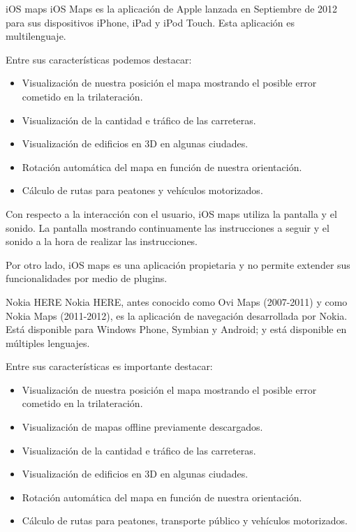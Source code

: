 \begin{definitionlist}
  \item[iOS maps] iOS Maps es la aplicación de Apple lanzada en Septiembre de 2012 para sus
    dispositivos iPhone, iPad y iPod Touch. Esta aplicación es multilenguaje.

    Entre sus características podemos destacar:

    \begin{itemize}
      \item Visualización de nuestra posición el mapa mostrando el posible error cometido en la
        trilateración.
      \item Visualización de la cantidad e tráfico de las carreteras.
      \item Visualización de edificios en 3D en algunas ciudades.
      \item Rotación automática del mapa en función de nuestra orientación.
      \item Cálculo de rutas para peatones y vehículos motorizados.
    \end{itemize}

    Con respecto a la interacción con el usuario, iOS maps utiliza la pantalla y el sonido. La
    pantalla mostrando continuamente las instrucciones a seguir y el sonido a la hora de realizar
    las instrucciones.

    Por otro lado, iOS maps es una aplicación propietaria y no permite extender sus funcionalidades
    por medio de plugins.

  \item[Nokia HERE] Nokia HERE, antes conocido como Ovi Maps (2007-2011) y como Nokia Maps
    (2011-2012), es la aplicación de navegación desarrollada por Nokia. Está disponible para Windows
    Phone, Symbian y Android; y está disponible en múltiples lenguajes.

    Entre sus características es importante destacar:

    \begin{itemize}
      \item Visualización de nuestra posición el mapa mostrando el posible error cometido en la
        trilateración.
      \item Visualización de mapas offline previamente descargados.
      \item Visualización de la cantidad e tráfico de las carreteras.
      \item Visualización de edificios en 3D en algunas ciudades.
      \item Rotación automática del mapa en función de nuestra orientación.
      \item Cálculo de rutas para peatones, transporte público y vehículos motorizados.
    \end{itemize}


\end{definitionlist}
